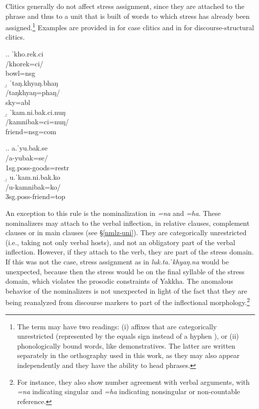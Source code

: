 Clitics generally do not affect stress assignment, since they are attached to the phrase and thus to a unit that is built of words to which stress has already been assigned.\footnote{The term   may have two readings: (i) affixes that are categorically unrestricted (represented by the equals sign \rede{=} instead of a hyphen \rede{-}), or (ii) phonologically bound words, like demonstratives. The latter are written separately in the orthography used in this work, as they  may also appear independently and they have the ability to head phrases.} Examples are provided in \Next for case clitics and in \NNext for discourse-structural clitics.


\ex.\a. \glll ˈkho.rek.ci\\
/khorek=ci/\\
bowl{\sc =nsg}\\
\b. \glll ˈtaŋ.khyaŋ.bhaŋ\\
/taŋkhyaŋ=phaŋ/\\
sky{\sc =abl}\\
\b. \glll ˈkam.ni.bak.ci.nuŋ\\
/kamnibak=ci=nuŋ/\\
friend{\sc =nsg=com}\\


\ex.\a. \glll a.ˈyu.bak.se\\
/a-yubak=se/\\
{\sc 1sg.poss-}goods{\sc =restr}\\
\b. \glll u.ˈkam.ni.bak.ko\\
/u-kamnibak=ko/\\
{\sc 3sg.poss-}friend{\sc =top}\\


An exception to this rule is the nominalization in \emph{=na} and \emph{=ha}. These nominalizers may attach to the verbal inflection, in relative clauses, complement clauses or in main clauses (see §\ref{nmlz-uni}). They are categorically unrestricted (i.e., taking not only verbal hosts), and not an obligatory part of the verbal inflection. However, if they attach to the verb, they are part of the stress domain. If this was not the case, stress assignment as in \emph{luk.ta.ˈkhyaŋ.na}  would be unexpected, because then the stress would be on the final syllable of the stress domain, which violates the prosodic constraints of Yakkha. The anomalous behavior of the nominalizers is not unexpected in light of the fact that they are being reanalyzed from discourse markers to part of the inflectional morphology.\footnote{For instance, they also show number agreement with verbal arguments, with \emph{=na} indicating singular and \emph{=ha} indicating nonsingular or non-countable reference.}

